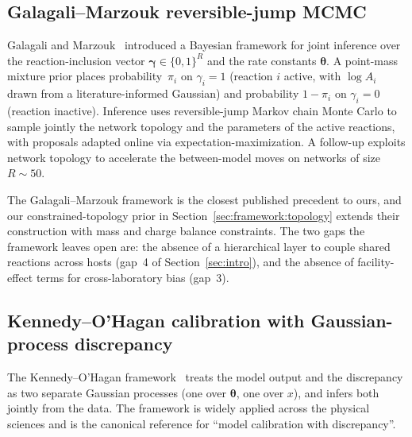 \documentclass[12pt]{article}
\theoremstyle{plain}
\theoremstyle{definition}
\theoremstyle{remark}
\begin{document}
\subsection{Galagali--Marzouk reversible-jump MCMC}\label{sec:sota:gm}

Galagali and Marzouk~\citep{GalagaliMarzouk2015} introduced a Bayesian
framework for joint inference over the reaction-inclusion vector
$\boldsymbol\gamma\in\{0,1\}^R$ and the rate constants
$\boldsymbol{\theta}$.  A point-mass mixture prior places probability~$\pi_i$
on $\gamma_i=1$ (reaction $i$ active, with $\log A_i$ drawn from a
literature-informed Gaussian) and probability $1-\pi_i$ on $\gamma_i=0$
(reaction inactive).  Inference uses reversible-jump Markov chain Monte
Carlo \citep{Green1995} to sample jointly the network topology and the
parameters of the active reactions, with proposals adapted online via
expectation-maximization.  A follow-up \citep{GalagaliMarzouk2019} exploits
network topology to accelerate the between-model moves on networks of size
$R\sim 50$.

The Galagali--Marzouk framework is the closest published precedent to ours,
and our constrained-topology prior in Section~\ref{sec:framework:topology}
extends their construction with mass and charge balance constraints.  The
two gaps the framework leaves open are:  the absence of a hierarchical
layer to couple shared reactions across hosts (gap~4 of
Section~\ref{sec:intro}), and the absence of facility-effect terms for
cross-laboratory bias (gap~3).

\subsection{Kennedy--O'Hagan calibration with Gaussian-process discrepancy}\label{sec:sota:ko}

The Kennedy--O'Hagan framework~\citep{KennedyOHagan2001} treats the model
output and the discrepancy as two separate Gaussian processes (one over
$\boldsymbol{\theta}$, one over $x$), and infers both jointly from the data.
The framework is widely applied across the physical sciences and is the
canonical reference for ``model calibration with discrepancy''.
\end{document}
